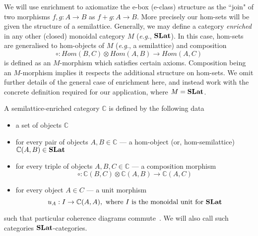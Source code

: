We will use enrichment to axiomatize the e-box (e-class) structure as the ``join" of two morphisms $f,g: A \to B$ as $f + g: A \to B$. 
More precisely our hom-sets will be given the structure of a semilattice.
Generally,  we may define a category \textit{enriched} in any other (closed) monoidal category $M$ (\textit{e.g.},  $\mathbf{SLat}$).
In this case,  hom-sets are generalised to hom-objects of $M$ (\textit{e.g.},  a semilattice) and composition 
\[
	\circ: Hom(B,C) \otimes Hom(A,B) \to Hom(A,C)
\]
is defined as an $M$-morphism which satisfies certain axioms.
Composition being an $M$-morphism implies it respects the additional structure on hom-sets.
We omit further details of the general case of enrichment here, and instead work with the concrete definition required for our application, where $M = \mathbf{SLat}$.

\begin{definition}
A semilattice-enriched category $\mathbb{C}$ is defined by the following data
\begin{itemize}
	\item a set of objects $\mathbb{C}$
	\item for every pair of objects $A,B \in \mathbb{C}$ --- a hom-object (or, hom-semilattice) $\mathbb{C}(A,B) \in \mathbf{SLat}$
	\item for every triple of objects $A,B,C \in \mathbb{C}$ --- a composition morphism
	\[
		\circ: \mathbb{C}(B,C) \otimes \mathbb{C}(A,B) \to \mathbb{C}(A,C)
	\]
	\item for every object $A \in C$ --- a unit morphism
	\[
	u_{A} : I \to \mathbb{C}(A,A), \text{ where $I$ is the monoidal unit for $\mathbf{SLat}$}
	\]
\end{itemize}
such that particular coherence diagrams commute~\cite{Borceux_1994}.
We will also call such categories $\mathbf{SLat}$-categories.
\end{definition}

